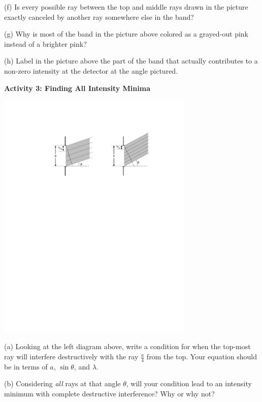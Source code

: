 (f) Is every possible ray between the top and middle rays drawn in the picture exactly canceled by another ray somewhere else in the band?
\answerspace{0.4in}

(g) Why is most of the band in the picture above colored as a grayed-out pink instead of a brighter pink?
\answerspace{0.4in}

(h) Label in the picture above the part of the band that actually contributes to a non-zero intensity at the detector at the angle pictured.

\pagebreak[3]
\textbf{Activity 3: Finding All Intensity Minima}


\vspace{-0.2in}
\begin{center}
\includegraphics[width=0.7\textwidth]{diffraction_of_light/fourths_and_sixths.pdf}
\end{center}
\vspace{-0.2in}

(a) Looking at the left diagram above, write a condition for when the top-most ray will interfere destructively with the ray $\frac{a}{4}$ from the top.  Your equation should be in terms of $a$, $\sin \theta$, and $\lambda$.  
\answerspace{0.4in}

(b) Considering \textit{all} rays at that angle $\theta$, will your condition lead to an intensity minimum with complete destructive interference?  Why or why not?
\answerspace{0.4in}

